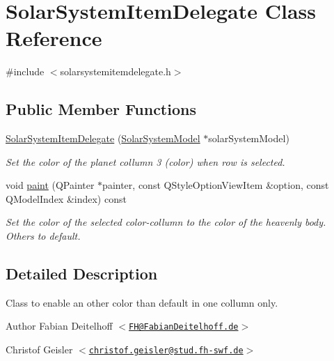 \hypertarget{classSolarSystemItemDelegate}{
\section{\-Solar\-System\-Item\-Delegate \-Class \-Reference}
\label{df/dae/classSolarSystemItemDelegate}
}


{\ttfamily \#include $<$solarsystemitemdelegate.\-h$>$}

\subsection*{\-Public \-Member \-Functions}
\begin{DoxyCompactItemize}
\item 
\hyperlink{classSolarSystemItemDelegate_affa8ec0ff65a3b53d324278eb9884732}{\-Solar\-System\-Item\-Delegate} (\hyperlink{classSolarSystemModel}{\-Solar\-System\-Model} $\ast$solar\-System\-Model)
\begin{DoxyCompactList}\small\item\em \-Set the color of the planet collumn 3 (color) when row is selected. \end{DoxyCompactList}\item 
void \hyperlink{classSolarSystemItemDelegate_ab7f726f1ba7cd6972a93cd366a129b37}{paint} (\-Q\-Painter $\ast$painter, const \-Q\-Style\-Option\-View\-Item \&option, const \-Q\-Model\-Index \&index) const 
\begin{DoxyCompactList}\small\item\em \-Set the color of the selected color-\/collumn to the color of the heavenly body. \-Others to default. \end{DoxyCompactList}\end{DoxyCompactItemize}


\subsection{\-Detailed \-Description}
\-Class to enable an other color than default in one collumn only.

\begin{DoxyAuthor}{\-Author}
\-Fabian \-Deitelhoff $<$\href{mailto:FH@FabianDeitelhoff.de}{\tt \-F\-H@\-Fabian\-Deitelhoff.\-de}$>$ 

\-Christof \-Geisler $<$\href{mailto:christof.geisler@stud.fh-swf.de}{\tt christof.\-geisler@stud.\-fh-\/swf.\-de}$>$ 
\end{DoxyAuthor}


